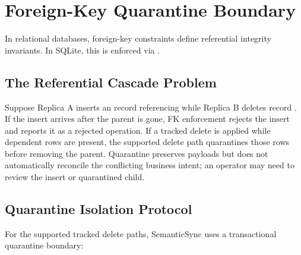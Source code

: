 \documentclass[runningheads]{llncs}
\begin{document}
\section{Foreign-Key Quarantine Boundary}
In relational databases, foreign-key constraints define referential integrity invariants. In SQLite, this is enforced via \texttt{}.

\subsection{The Referential Cascade Problem}
Suppose Replica A inserts an \texttt{} record referencing \texttt{} while Replica B deletes \texttt{} record \texttt{}. If the insert arrives after the parent is gone, FK enforcement rejects the insert and reports it as a rejected operation. If a tracked delete is applied while dependent rows are present, the supported delete path quarantines those rows before removing the parent. Quarantine preserves payloads but does not automatically reconcile the conflicting business intent; an operator may need to review the insert or quarantined child.

\subsection{Quarantine Isolation Protocol}
For the supported tracked delete paths, SemanticSync uses a transactional quarantine boundary:
\end{document}
